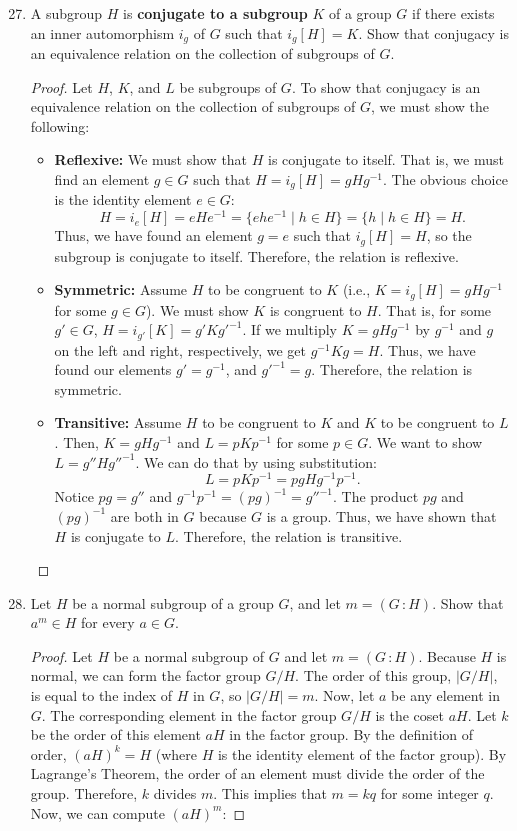 \documentclass[12pt, oneside]{book}
\newcommand{\pf}[1]{
    \begin{customframedproof}[linecolor=orangehdx!75]
        \begin{proof}
        #1
        \end{proof}
    \end{customframedproof}
}
\newcommand{\funccolon}{\, \colon}
\begin{document}
\begin{enumerate}
    \setcounter{enumi}{26}
    \item A subgroup \(H\) is \textbf{conjugate to a subgroup} \(K\) of a group \(G\) if there exists an inner automorphism \(i_g\) of \(G\) such that \(i_g[H] = K\). Show that conjugacy is an equivalence relation on the collection of subgroups of \(G\).
    \pf{
        Let \(H\), \(K\), and \(L\) be subgroups of \(G\). To show that conjugacy is an equivalence relation on the collection of subgroups of \(G\), we must show the following:
        \begin{itemize}
            \item \textbf{Reflexive:} We must show that \(H\) is conjugate to itself. That is, we must find an element \(g \in G\) such that \(H = i_{g}[H] = gHg^{-1}\). The obvious choice is the identity element \(e \in G\):
            \[
                H = i_{e}[H] = eHe^{-1} = \{ehe^{-1} \mid h \in H\} = \{h \mid h \in H\} = H.
            \]
            Thus, we have found an element \(g = e\) such that \(i_{g}[H] = H\), so the subgroup is conjugate to itself. Therefore, the relation is reflexive.
            \item \textbf{Symmetric:} Assume \(H\) to be congruent to \(K\) (i.e., \(K = i_{g}[H] = gHg^{-1}\) for some \(g \in G\)). We must show \(K\) is congruent to \(H\). That is, for some \(g' \in G\), \(H = i_{g'}[K] = g'Kg'^{-1}\). If we multiply \(K = gHg^{-1}\) by \(g^{-1}\) and \(g\) on the left and right, respectively, we get \(g^{-1}Kg = H\). Thus, we have found our elements \(g' = g^{-1}\), and \(g'^{-1} = g\). Therefore, the relation is symmetric.
            \item \textbf{Transitive:} Assume \(H\) to be congruent to \(K\) and \(K\) to be congruent to \(L\). Then, \(K = gHg^{-1}\) and \(L = pKp^{-1}\) for some \(p \in G\). We want to show \(L = g''Hg''^{-1}\). We can do that by using substitution:
            \[
                L = pKp^{-1} = pgHg^{-1}p^{-1}.
            \]
            Notice \(pg = g''\) and \(g^{-1}p^{-1} = (pg)^{-1} = g''^{-1}\). The product \(pg\) and \((pg)^{-1}\) are both in \(G\) because \(G\) is a group. Thus, we have shown that \(H\) is conjugate to \(L\). Therefore, the relation is transitive. \qedhere
        \end{itemize}
    }
\newpage
    \setcounter{enumi}{29}
    \item Let \(H\) be a normal subgroup of a group \(G\), and let \(m = (G \funccolon H)\). Show that \(a^m \in H\) for every \(a \in G\).
    \pf{
        Let \(H\) be a normal subgroup of \(G\) and let \(m = (G \funccolon H)\). Because \(H\) is normal, we can form the factor group \(G/H\). The order of this group, \(|G/H|\), is equal to the index of \(H\) in \(G\), so \(|G/H| = m\). Now, let \(a\) be any element in \(G\). The corresponding element in the factor group \(G/H\) is the coset \(aH\). Let \(k\) be the order of this element \(aH\) in the factor group. By the definition of order, \((aH)^{k} = H\) (where \(H\) is the identity element of the factor group). By Lagrange's Theorem, the order of an element must divide the order of the group. Therefore, \(k\) divides \(m\). This implies that \(m = kq\) for some integer \(q\). Now, we can compute \((aH)^{m}\):
}
\end{enumerate}
\end{document}
